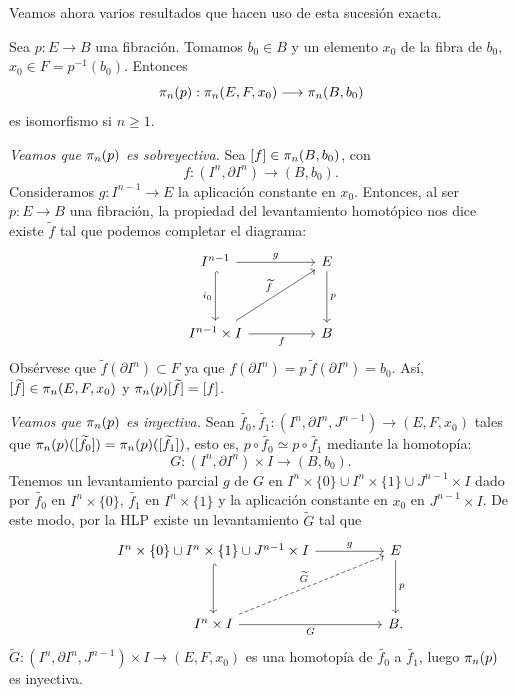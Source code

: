 Veamos ahora varios resultados que hacen uso de esta sucesión exacta.

\begin{teor}
Sea $p : E \longrightarrow B$ una fibración. Tomamos $b_0 \in B$ y un elemento $x_0$ de la fibra de $b_0$,  $x_0 \in F = p^{-1}(b_0)$. Entonces
\[
\homot{n}{p} : \homot{n}{E, F, x_0} \longrightarrow \homot{n}{B, b_0}
\]
es isomorfismo si $n \geq 1$.
\end{teor}
\begin{demo} \par
\textit{Veamos que $\pi_{n}(p)$ es sobreyectiva.} Sea $[f] \in \pi_{n}(B, b_0)$, con
\[f: (I^n, \partial I^n) \longrightarrow (B, b_0).\]
Consideramos $g: I^{n-1} \longrightarrow E$ la aplicación constante en $x_0$. Entonces, al ser $p: E \longrightarrow B$ una fibración, la propiedad del levantamiento homotópico nos dice existe $\widetilde{f}$ tal que podemos completar el diagrama:
\[
\begin{tikzcd}
I^{n-1} \arrow{rr}{g} \arrow[hook, swap]{dd}{i_0} & & E \arrow{dd}{p} \\
\\
I^{n-1} \times I \arrow[swap]{rr}{f} \arrow{uurr}{\widetilde{f}} & & B
\end{tikzcd}
\]
Obsérvese que $\widetilde{f}(\partial I^n) \subset F$ ya que $f (\partial I^n) = p \ \widetilde{f}(\partial I^n) = b_0$. Así, $[\widetilde{f}] \in \pi_{n}(E, F, x_0)$ y $\pi_{n}(p)[\widetilde{f}] = [f]$. \par
\textit{Veamos que $\pi_{n}(p)$ es inyectiva.} Sean $\widetilde{f_0}, \widetilde{f_1} : (I^n, \partial I^n, J^{n-1}) \longrightarrow (E, F, x_0)$ tales que $\pi_{n}(p)([\widetilde{f_0}]) = \pi_{n}(p)([\widetilde{f_1}])$, esto es, $p \circ \widetilde{f_0} \simeq p \circ \widetilde{f_1}$ mediante la homotopía:
\[
G: (I^n, \partial I^n) \times I \longrightarrow (B, b_0).
\]
Tenemos un levantamiento parcial $g$ de $G$ en $I^n \times \{0\} \cup I^n \times \{1\} \cup J^{n-1} \times I$ dado por $\widetilde{f_0}$ en $I^n \times \{0\}$, $\widetilde{f_1}$ en $I^n \times \{1\}$ y la aplicación constante en $x_0$ en $J^{n-1} \times I$. De este modo, por la HLP existe un levantamiento $\widetilde{G}$ tal que
\[
\begin{tikzcd}
I^n \times \{0\} \cup I^n \times \{1\} \cup J^{n-1} \times I \arrow[hook]{dd} \arrow{rr}{g} & & E \arrow{dd}{p} \\
\\
I^n \times I \arrow[swap]{rr}{G} \arrow[dashed]{uurr}{\widetilde{G}}& & B.
\end{tikzcd}
\]
$\widetilde{G} : (I^n, \partial I^n, J^{n-1}) \times I \longrightarrow (E, F, x_0)$ es una homotopía de $\widetilde{f_0}$ a $\widetilde{f_1}$, luego $\pi_{n}(p)$ es inyectiva.
\end{demo}

